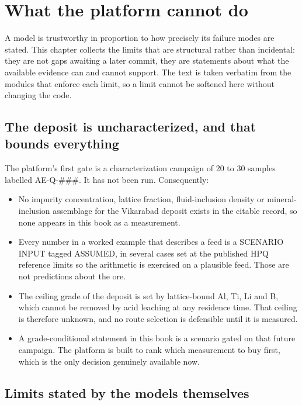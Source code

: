 \documentclass[10pt,a4paper,twoside]{report}
\begin{document}
\normalsize

\clearpage

\chapter{What the platform cannot do}\label{ch:cannot}

A model is trustworthy in proportion to how precisely its failure modes are stated. This chapter collects the limits that are structural rather than incidental: they are not gaps awaiting a later commit, they are statements about what the available evidence can and cannot support. The text is taken verbatim from the modules that enforce each limit, so a limit cannot be softened here without changing the code.

\section{The deposit is uncharacterized, and that bounds everything}

The platform's first gate is a characterization campaign of 20 to 30 samples labelled AE-Q-\#\#\#. It has not been run. Consequently:

\begin{itemize}
\item No impurity concentration, lattice fraction, fluid-inclusion density or
      mineral-inclusion assemblage for the Vikarabad deposit exists in the
      citable record, so none appears in this book as a measurement.
\item Every number in a worked example that describes a feed is a SCENARIO
      INPUT tagged ASSUMED, in several cases set at the published HPQ reference
      limits so the arithmetic is exercised on a plausible feed. Those are not
      predictions about the ore.
\item The ceiling grade of the deposit is set by lattice-bound Al, Ti, Li and
      B, which cannot be removed by acid leaching at any residence time. That
      ceiling is therefore unknown, and no route selection is defensible until
      it is measured.
\item A grade-conditional statement in this book is a scenario gated on that
      future campaign. The platform is built to rank which measurement to buy
      first, which is the only decision genuinely available now.
\end{itemize}

\section{Limits stated by the models themselves}
\end{document}
